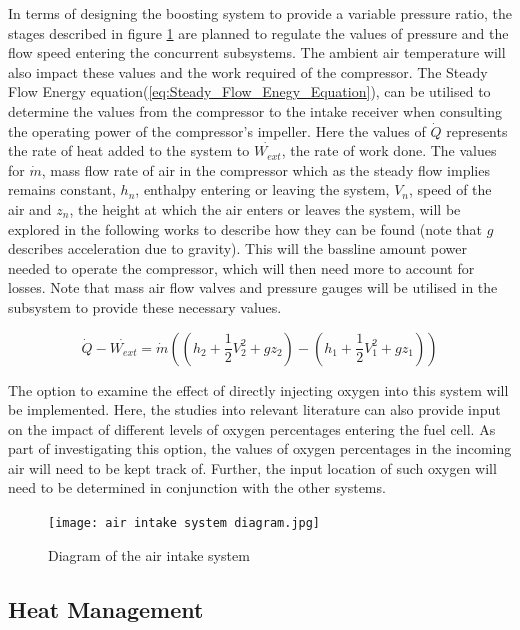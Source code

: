 \documentclass[a4paper,11pt]{article}
\begin{document}
In terms of designing the boosting system to provide a variable pressure ratio, the stages described in figure \ref{fig:airIntakeSys} are planned to regulate the values of pressure and the flow speed entering the concurrent subsystems. The ambient air temperature will also impact these values and the work required of the compressor. The Steady Flow Energy equation(\ref{eq:Steady_Flow_Enegy_Equation}), can be utilised to determine the values from the compressor to the intake receiver when consulting the operating power of the compressor's impeller. Here the values of $\dot{Q}$ represents the rate of heat added to the system to $\dot{W_{ext}}$, the rate of work done. The values for $\dot{m}$, mass flow rate of air in the compressor which as the steady flow implies remains constant, $h_n$, enthalpy entering or leaving the system, $V_n$, speed of the air and $z_n$, the height at which the air enters or leaves the system, will be explored in the following works to describe how they can be found (note that $g$ describes acceleration due to gravity). This will the bassline amount power needed to operate the compressor, which will then need more to account for losses. Note that mass air flow valves and pressure gauges will be utilised in the subsystem to provide these necessary values. 

\begin{equation}\label{eq:Steady_Flow_Enegy_Equation}
        \dot{Q}-\dot{W_{ext}}=\dot{m}((h_{2}+\frac{1}{2}V_{2}^{2}+gz_{2})-(h_{1}+\frac{1}{2}V_{1}^{2}+gz_{1}))
\end{equation}

The option to examine the effect of directly injecting oxygen into this system will be implemented. Here, the studies into relevant literature can also provide input on the impact of different levels of oxygen percentages entering the fuel cell. As part of investigating this option, the values of oxygen percentages in the incoming air will need to be kept track of. Further, the input location of such oxygen will need to be determined in conjunction with the other systems.  

\begin{figure}[h]
    \texttt{[image: air intake system diagram.jpg]}
    \caption{Diagram of the air intake system}
    \centering
    \label{fig:airIntakeSys}  
\end{figure}


\subsection{Heat Management}
\end{document}
